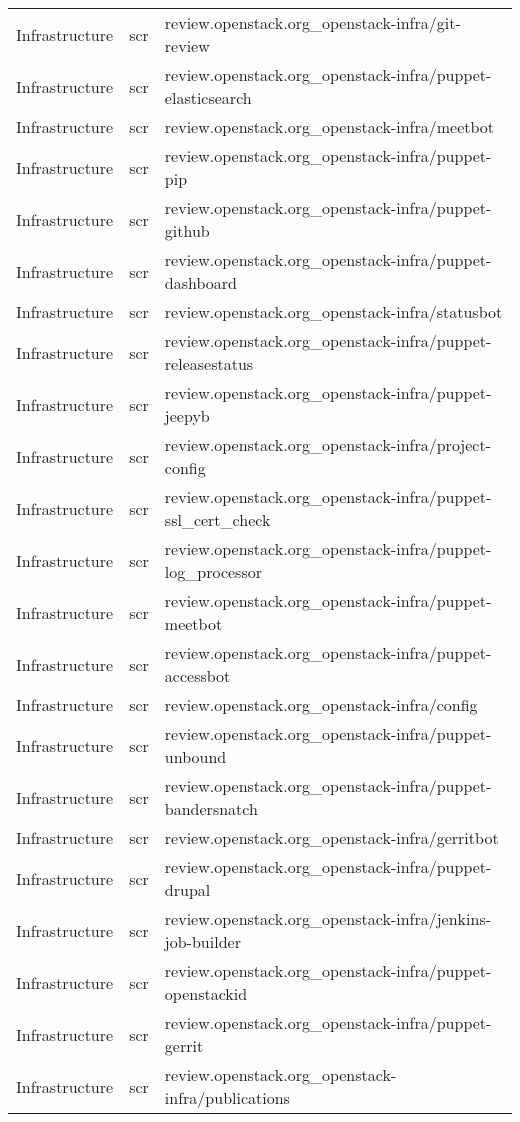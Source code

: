 \begin{center}
\begin{longtable}{|p{4cm}|p{1cm}|p{10cm}|}
Infrastructure&scr&review.openstack.org\_openstack-infra/git-review\\ 
Infrastructure&scr&review.openstack.org\_openstack-infra/puppet-elasticsearch\\ 
Infrastructure&scr&review.openstack.org\_openstack-infra/meetbot\\ 
Infrastructure&scr&review.openstack.org\_openstack-infra/puppet-pip\\ 
Infrastructure&scr&review.openstack.org\_openstack-infra/puppet-github\\ 
Infrastructure&scr&review.openstack.org\_openstack-infra/puppet-dashboard\\ 
Infrastructure&scr&review.openstack.org\_openstack-infra/statusbot\\ 
Infrastructure&scr&review.openstack.org\_openstack-infra/puppet-releasestatus\\ 
Infrastructure&scr&review.openstack.org\_openstack-infra/puppet-jeepyb\\ 
Infrastructure&scr&review.openstack.org\_openstack-infra/project-config\\ 
Infrastructure&scr&review.openstack.org\_openstack-infra/puppet-ssl\_cert\_check\\ 
Infrastructure&scr&review.openstack.org\_openstack-infra/puppet-log\_processor\\ 
Infrastructure&scr&review.openstack.org\_openstack-infra/puppet-meetbot\\ 
Infrastructure&scr&review.openstack.org\_openstack-infra/puppet-accessbot\\ 
Infrastructure&scr&review.openstack.org\_openstack-infra/config\\ 
Infrastructure&scr&review.openstack.org\_openstack-infra/puppet-unbound\\ 
Infrastructure&scr&review.openstack.org\_openstack-infra/puppet-bandersnatch\\ 
Infrastructure&scr&review.openstack.org\_openstack-infra/gerritbot\\ 
Infrastructure&scr&review.openstack.org\_openstack-infra/puppet-drupal\\ 
Infrastructure&scr&review.openstack.org\_openstack-infra/jenkins-job-builder\\ 
Infrastructure&scr&review.openstack.org\_openstack-infra/puppet-openstackid\\ 
Infrastructure&scr&review.openstack.org\_openstack-infra/puppet-gerrit\\ 
Infrastructure&scr&review.openstack.org\_openstack-infra/publications\\ 

\end{longtable}
\end{center}
